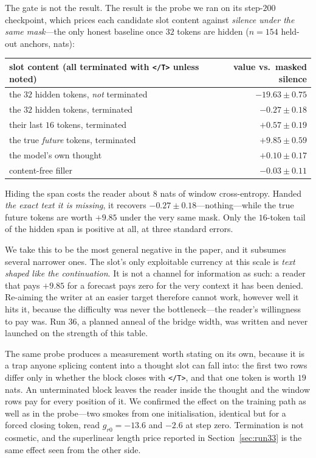 \documentclass{article} %
\newcommand{\tend}{\texttt{</T>}}
\begin{document}
The gate is not the result. The result is the probe we ran on its step-$200$ checkpoint, which
prices each candidate slot content against \emph{silence under the same mask}---the only honest
baseline once $32$ tokens are hidden ($n = 154$ held-out anchors, nats):

\begin{center}
\begin{tabular}{@{}lr@{}}
\toprule
slot content (all terminated with \tend{} unless noted) & value vs.\ masked silence \\
\midrule
the $32$ hidden tokens, \emph{not} terminated & $-19.63 \pm 0.75$ \\
the $32$ hidden tokens, terminated            & $-0.27 \pm 0.18$ \\
their last $16$ tokens, terminated            & $+0.57 \pm 0.19$ \\
the true \emph{future} tokens, terminated     & $+9.85 \pm 0.59$ \\
the model's own thought                       & $+0.10 \pm 0.17$ \\
content-free filler                           & $-0.03 \pm 0.11$ \\
\bottomrule
\end{tabular}
\end{center}

Hiding the span costs the reader about $8$ nats of window cross-entropy. Handed \emph{the exact
text it is missing}, it recovers $-0.27 \pm 0.18$---nothing---while the true future tokens are
worth $+9.85$ under the very same mask. Only the $16$-token tail of the hidden span is positive
at all, at three standard errors.

We take this to be the most general negative in the paper, and it subsumes several narrower ones.
The slot's only exploitable currency at this scale is \emph{text shaped like the continuation}.
It is not a channel for information as such: a reader that pays $+9.85$ for a forecast pays zero
for the very context it has been denied. Re-aiming the writer at an easier target therefore cannot
work, however well it hits it, because the difficulty was never the bottleneck---the reader's
willingness to pay was. Run 36, a planned anneal of the bridge width, was written and never
launched on the strength of this table.

The same probe produces a measurement worth stating on its own, because it is a trap anyone
splicing content into a thought slot can fall into: the first two rows differ only in whether the
block closes with \tend{}, and that one token is worth $19$ nats. An unterminated block leaves the
reader inside the thought and the window rows pay for every position of it. We confirmed the
effect on the training path as well as in the probe---two smokes from one initialisation, identical
but for a forced closing token, read $g_{r0} = -13.6$ and $-2.6$ at step zero. Termination is not
cosmetic, and the superlinear length price reported in Section~\ref{sec:run33} is the same effect
seen from the other side.
\end{document}
